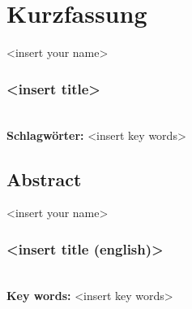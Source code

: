 
\section*{Kurzfassung}

<insert your name>
\subsubsection*{<insert title>}


%
\mbox{}\\[0.5\baselineskip]\noindent
\textbf{Schlagwörter:} 
<insert key words>
\clearpage
\subsection*{Abstract}

<insert your name>
\subsubsection*{<insert title (english)>}


%
\mbox{}\\[0.5\baselineskip]\noindent
\textbf{Key words:} 
<insert key words>